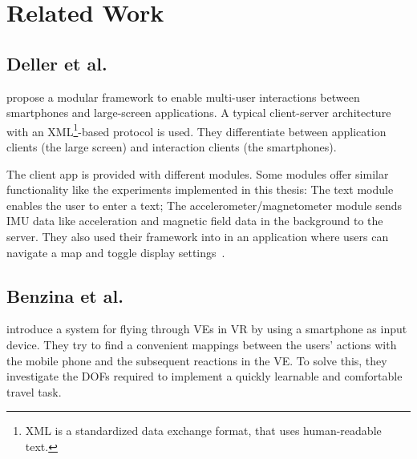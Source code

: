 \chapter{Related Work}\label{chapter:related-work}


\section{Deller et al.}\label{section:deller-2011}
\citeauthor{Deller.2011} propose a modular framework to enable multi-user interactions between smartphones and large-screen applications. A typical client-server architecture with an XML\footnote{XML is a standardized data exchange format, that uses human-readable text.}-based protocol is used. They differentiate between application clients (the large screen) and interaction clients (the smartphones). 

The client app is provided with different modules. Some modules offer similar functionality like the experiments implemented in this thesis: The text module enables the user to enter a text; The accelerometer/magnetometer module sends \ac{IMU} data like acceleration and magnetic field data in the background to the server. They also used their framework into in an application where users can navigate a map and toggle display settings~\cite{Deller.2011}.


\section{Benzina et al.}\label{section:benzina-2011}
\citeauthor{Benzina.2011} introduce a system for flying through \acp{VE} in \ac{VR} by using a smartphone as input device. 
They try to find a convenient mappings between the users' actions with the mobile phone and the subsequent reactions in the \ac{VE}. To solve this, they investigate the \acp{DOF} required to implement a quickly learnable and comfortable travel task.

